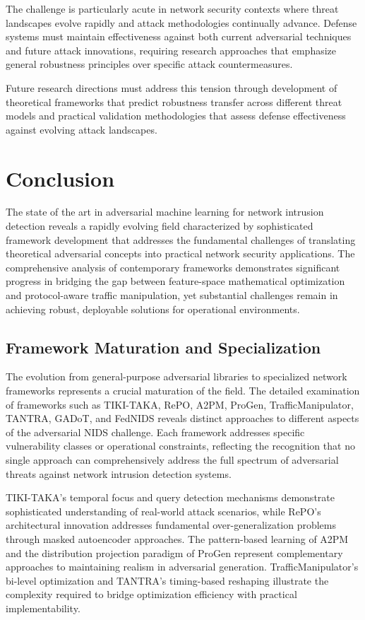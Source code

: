 The challenge is particularly acute in network security contexts where threat landscapes evolve rapidly and attack methodologies continually advance. Defense systems must maintain effectiveness against both current adversarial techniques and future attack innovations, requiring research approaches that emphasize general robustness principles over specific attack countermeasures.

Future research directions must address this tension through development of theoretical frameworks that predict robustness transfer across different threat models and practical validation methodologies that assess defense effectiveness against evolving attack landscapes.

\section{Conclusion}
\label{sec:sota_conclusion}

The state of the art in adversarial machine learning for network intrusion detection reveals a rapidly evolving field characterized by sophisticated framework development that addresses the fundamental challenges of translating theoretical adversarial concepts into practical network security applications. The comprehensive analysis of contemporary frameworks demonstrates significant progress in bridging the gap between feature-space mathematical optimization and protocol-aware traffic manipulation, yet substantial challenges remain in achieving robust, deployable solutions for operational environments.

\subsection{Framework Maturation and Specialization}

The evolution from general-purpose adversarial libraries to specialized network frameworks represents a crucial maturation of the field. The detailed examination of frameworks such as TIKI-TAKA, RePO, A2PM, ProGen, TrafficManipulator, TANTRA, GADoT, and FedNIDS reveals distinct approaches to different aspects of the adversarial NIDS challenge. Each framework addresses specific vulnerability classes or operational constraints, reflecting the recognition that no single approach can comprehensively address the full spectrum of adversarial threats against network intrusion detection systems.

TIKI-TAKA's temporal focus and query detection mechanisms demonstrate sophisticated understanding of real-world attack scenarios, while RePO's architectural innovation addresses fundamental over-generalization problems through masked autoencoder approaches. The pattern-based learning of A2PM and the distribution projection paradigm of ProGen represent complementary approaches to maintaining realism in adversarial generation. TrafficManipulator's bi-level optimization and TANTRA's timing-based reshaping illustrate the complexity required to bridge optimization efficiency with practical implementability.

